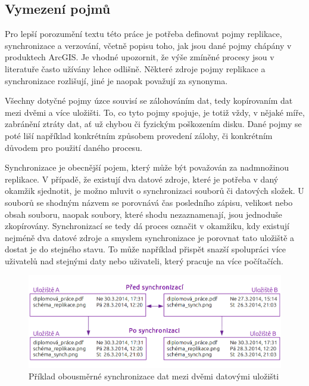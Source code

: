         \subsection{Vymezení pojmů}
Pro lepší porozumění textu této práce je potřeba definovat pojmy replikace, synchronizace a verzování, včetně popisu toho, jak jsou dané pojmy chápány v produktech ArcGIS. Je vhodné upozornit, že výše zmíněné procesy jsou v literatuře často užívány lehce odlišně. Některé zdroje pojmy replikace a synchronizace rozlišují, jiné je naopak považují za synonyma. 

Všechny dotyčné pojmy úzce souvisí se zálohováním dat, tedy kopírovaním dat mezi dvěmi a více uložišti. To, co tyto pojmy spojuje, je totiž vždy, v nějaké míře, zabránění ztráty dat, ať už chybou či fyzickým poškozením disku. Dané pojmy se poté liší například konkrétním způsobem provedení zálohy, či konkrétním důvodem pro použití daného procesu.

Synchronizace je obecnější pojem, který může být považován za nadmnožinou replikace. V případě, že existují dva datové zdroje, které je potřeba v daný okamžik sjednotit, je možno mluvit o synchronizaci souborů či datových složek. U souborů se shodným názvem se porovnává čas posledního zápisu, velikost nebo obsah souboru, naopak soubory, které shodu nezaznamenají, jsou jednoduše zkopírovány. Synchronizací se tedy dá proces označit v okamžiku, kdy existují nejméně dva datové zdroje a smyslem synchronizace je porovnat tato uložiště a dostat je do stejného stavu. To může například přispět snazší spolupráci více uživatelů nad stejnými daty nebo uživateli, který pracuje na více počítačích.


          \begin{figure}[H]
            \centering
            \includegraphics[scale=1]{../../../grafy/obr/schema_synchronizace_maxiTence.png}
            \caption {Příklad obousměrné synchronizace dat mezi dvěmi datovými uložišti}
          \end{figure}

